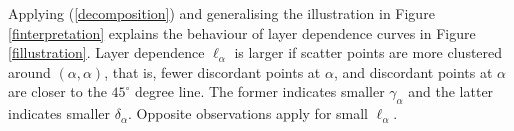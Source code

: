 \documentclass[authoryear]{elsarticle}
\newcommand{\E}{{\mathrm E}}
\newcommand{\eref}[1]{(\ref{#1})}
\newcommand{\fref}[1]{Figure \ref{#1}}
\newcommand{\sref}[1]{\S\ref{#1}}
\begin{document}
Applying \eref{decomposition} and generalising the illustration in \fref{finterpretation} explains the behaviour of layer dependence curves in \fref{fillustration}. Layer dependence $\ell_\alpha$ is larger if scatter points are more clustered around $(\alpha,\alpha)$, that is, fewer discordant points at $\alpha$, and discordant points at $\alpha$ are closer to the $45^\circ$ degree line. The former indicates smaller $\gamma_\alpha$ and the latter indicates smaller $\delta_\alpha$. Opposite observations apply for small $\ell_\alpha$.

\end{document}
